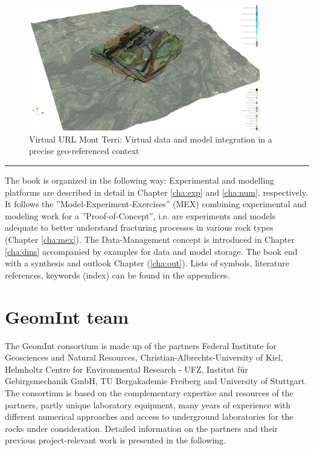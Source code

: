 \begin{figure}[ht!]
\centering
\includegraphics[width=0.9\textwidth]{figures/mt-surface+move.png}
\caption{Virtual URL Mont Terri: Virtual data and model integration in a precise geo-referenced context}
\label{fig:vr-url}
\end{figure}

\bigskip
\hrule
\bigskip

The book is organized in the following way:
Experimental and modelling platforms are described in detail in Chapter \ref{cha:exp} and \ref{cha:num}, respectively. It follows the ''Model-Experiment-Exercises'' (MEX) combining experimental and modeling work for a ''Proof-of-Concept'', i.e. are experiments and models adequate to better understand fracturing processes in various rock types (Chapter \ref{cha:mex}). The Data-Management concept is introduced in Chapter \ref{cha:dms} accompanied by examples for data and model storage. The book end with a synthesis and outlook Chapter (\ref{cha:out}). Lists of symbols, literature references, keywords (index) can be found in the appendices.

\clearpage
\section{GeomInt team}
\label{sec:team}

The GeomInt consortium is made up of the partners Federal Institute for Geosciences and Natural Resources, Christian-Albrechts-University of Kiel, Helmholtz Centre for Environmental Research - UFZ, Institut f\"ur Gebirgs\-mechanik GmbH, TU Bergakademie Freiberg and University of Stuttgart. The consortium is based on the complementary expertise and resources of the partners, partly unique laboratory equipment, many years of experience with different numerical approaches and access to underground laboratories for the rocks under consideration. Detailed information on the partners and their previous project-relevant work is presented in the following.

